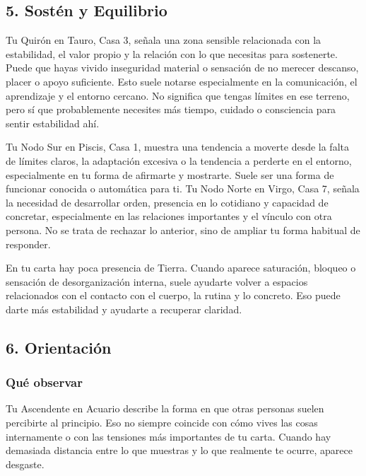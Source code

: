 \documentclass[11pt,a4paper]{article}\usepackage[utf8]{inputenc}
\begin{document}
\vspace{0.8cm}

\subsection{5. Sostén y Equilibrio}

Tu Quirón en Tauro, Casa 3, señala una zona sensible relacionada con la estabilidad, el valor propio y la relación con lo que necesitas para sostenerte. Puede que hayas vivido inseguridad material o sensación de no merecer descanso, placer o apoyo suficiente. Esto suele notarse especialmente en la comunicación, el aprendizaje y el entorno cercano. No significa que tengas límites en ese terreno, pero sí que probablemente necesites más tiempo, cuidado o consciencia para sentir estabilidad ahí.

\vspace{0.3cm}
Tu Nodo Sur en Piscis, Casa 1, muestra una tendencia a moverte desde la falta de límites claros, la adaptación excesiva o la tendencia a perderte en el entorno, especialmente en tu forma de afirmarte y mostrarte. Suele ser una forma de funcionar conocida o automática para ti. Tu Nodo Norte en Virgo, Casa 7, señala la necesidad de desarrollar orden, presencia en lo cotidiano y capacidad de concretar, especialmente en las relaciones importantes y el vínculo con otra persona. No se trata de rechazar lo anterior, sino de ampliar tu forma habitual de responder.

\vspace{0.3cm}
En tu carta hay poca presencia de Tierra. Cuando aparece saturación, bloqueo o sensación de desorganización interna, suele ayudarte volver a espacios relacionados con el contacto con el cuerpo, la rutina y lo concreto. Eso puede darte más estabilidad y ayudarte a recuperar claridad.

\vspace{0.8cm}

\subsection{6. Orientación}

\subsubsection*{Qué observar}
Tu Ascendente en Acuario describe la forma en que otras personas suelen percibirte al principio. Eso no siempre coincide con cómo vives las cosas internamente o con las tensiones más importantes de tu carta. Cuando hay demasiada distancia entre lo que muestras y lo que realmente te ocurre, aparece desgaste.
\end{document}

